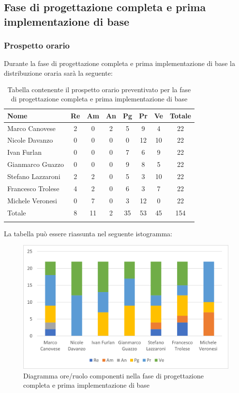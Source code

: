 			\subsection{Fase di progettazione completa e prima implementazione di base}
            \subsubsection{Prospetto orario}
			Durante la fase di progettazione completa e prima implementazione di base la distribuzione oraria sarà la seguente:
			
			\begin{longtable}{|l|c|c|c|c|c|c|c|}
				\hline
				\rowcolor{lighter-grayer}
				\textbf{Nome} & \textbf{Re} & \textbf{Am} & \textbf{An} & \textbf{Pg}  & \textbf{Pr}   & \textbf{Ve} & \textbf{Totale} \\
				\hline
				\endfirsthead
				
				\hline
				Marco Canovese & 2 & 0 & 2 & 5 & 9 & 4 & 22\\
				\hline
				\hline
				Nicole Davanzo & 0 & 0 & 0 & 0 & 12 & 10 & 22\\
				\hline
				\hline
				Ivan Furlan & 0 & 0 & 0 & 7 & 6 & 9 & 22\\
				\hline
				\hline
				Gianmarco Guazzo & 0 & 0 & 0 & 9 & 8 & 5 & 22\\
				\hline
				\hline
				Stefano Lazzaroni & 2 & 2 & 0 & 5 & 3 & 10 & 22\\
				\hline
				\hline
				Francesco Trolese & 4 & 2 & 0 & 6 & 3 & 7 & 22\\
				\hline
				\hline
				Michele Veronesi & 0 & 7 & 0 & 3 & 12 & 0 & 22\\
				\hline 
				\hline
				Totale & 8 & 11 & 2 & 35 & 53 & 45 & 154\\
				\hline 
				\rowcolor{white}
				\caption{Tabella contenente il prospetto orario preventivato per la fase di progettazione completa e prima implementazione di base}
			\end{longtable}

		
			La tabella può essere riassunta nel seguente istogramma:
		
			\begin{figure}[H]
				\centering
				\includegraphics[width=0.8\linewidth]{res/images/preventivo/5-1.png}
				\caption{Diagramma ore/ruolo componenti nella fase di progettazione completa e prima implementazione di base}
				\label{fig:diagramma suddivisione ruoli fase progettazione completa e prima implementazione di base}
			\end{figure}
		
